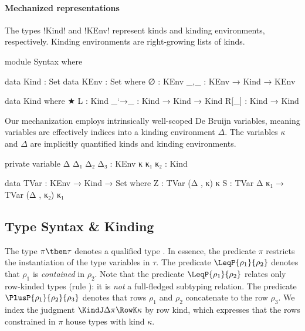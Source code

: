 \paragraph{Mechanized representations} The types !Kind! and !KEnv! represent kinds and kinding environments, respectively. Kinding environments are right-growing lists of kinds.

\begin{code}[hide]
module Syntax where
\end{code}
\begin{code}
  data Kind : Set 
  data KEnv : Set where
    ∅ : KEnv 
    _,_ : KEnv → Kind → KEnv
\end{code}
\begin{code}[hide]
  data Kind where 
    ★ L : Kind 
    _`→_ : Kind → Kind → Kind 
    R[_] : Kind → Kind 
\end{code}

Our mechanization employs intrinsically well-scoped De Bruijn variables, meaning variables are effectively indices into a kinding environment $\Delta$. The variables $\kappa$ and $\Delta$ are implicitly quantified kinds and kinding environments.

\begin{code}[hide]
  private 
    variable 
      Δ Δ₁ Δ₂ Δ₃ : KEnv 
      κ κ₁ κ₂ : Kind
\end{code}
\begin{code} 
  data TVar : KEnv → Kind → Set where
    Z : TVar (Δ , κ) κ
    S : TVar Δ κ₁ → TVar (Δ , κ₂) κ₁ 
\end{code}

\subsection{Type Syntax \& Kinding}


The type $\pi \then \tau$ denotes a qualified type \citep{Jones92}. In essence, the predicate $\pi$ restricts the instantiation of the type variables in $\tau$. The predicate $\LeqP {\rho_1} {\rho_2}$ denotes that $\rho_1$ is \emph{contained} in $\rho_2$. Note that the predicate $\LeqP {\rho_1} {\rho_2}$ relates only row-kinded types (rule \ksrule{$\lesssim$}): it is \emph{not} a full-fledged subtyping relation. The predicate $\PlusP {\rho_{1}} {\rho_{2}} {\rho_{3}}$ denotes that rows $\rho_{1}$ and $\rho_{2}$ concatenate to the row $\rho_{3}$. We index the judgment $\KindJ \Delta \pi {\RowK \kappa}$ by row kind, which expresses that the rows constrained in $\pi$ house types with kind $\kappa$.

